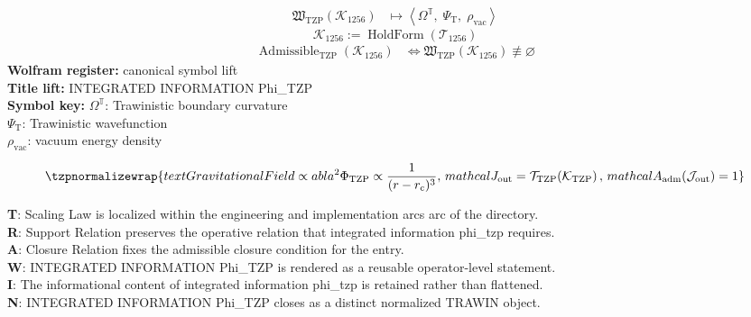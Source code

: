 \noindent
\begin{minipage}[t]{0.48\linewidth}
\begingroup
\small
\[
\begin{aligned}
\mathfrak{W}_{\mathrm{TZP}}\!\left(\mathcal{K}_{1256}\right)
&\longmapsto
\left\langle \Omega^{\mathbb{T}},\; \Psi_{\mathrm{T}},\; \rho_{\mathrm{vac}} \right\rangle
\end{aligned}
\]
\[
\mathcal{K}_{1256}
:=
\operatorname{HoldForm}\!\left(\mathcal{T}_{1256}\right)
\]
\[
\begin{aligned}
\operatorname{Admissible}_{\mathrm{TZP}}\!\left(\mathcal{K}_{1256}\right)
&\Longleftrightarrow
\mathfrak{W}_{\mathrm{TZP}}\!\left(\mathcal{K}_{1256}\right)\not\equiv\varnothing
\end{aligned}
\]
\textbf{Wolfram register:} canonical symbol lift\\
\textbf{Title lift:} INTEGRATED INFORMATION Phi\_TZP\\
\textbf{Symbol key:} \(\Omega^{\mathbb{T}}\): Trawinistic boundary curvature\\ \(\Psi_{\mathrm{T}}\): Trawinistic wavefunction\\ \(\rho_{\mathrm{vac}}\): vacuum energy density
\par
\endgroup
\end{minipage}\hfill
\begin{minipage}[t]{0.48\linewidth}
\[
\tzpnormalizewrap{text{Gravitational Field} \propto  abla^2 \Phi_{\text{TZP}} \propto \frac{1}{(r - r_{\mathrm{c}})^3},\,mathcal{J}_{\mathrm{out}} = \mathcal{T}_{\mathrm{TZP}}\!\left(\mathcal{K}_{\mathrm{TZP}}\right),\,mathcal{A}_{\mathrm{adm}}\!\left(\mathcal{J}_{\mathrm{out}}\right)=1}
\]

\small
\textbf{T}: Scaling Law is localized within the engineering and implementation arcs arc of the directory.\\
\textbf{R}: Support Relation preserves the operative relation that integrated information phi\_tzp requires.\\
\textbf{A}: Closure Relation fixes the admissible closure condition for the entry.\\
\textbf{W}: INTEGRATED INFORMATION Phi\_TZP is rendered as a reusable operator-level statement.\\
\textbf{I}: The informational content of integrated information phi\_tzp is retained rather than flattened.\\
\textbf{N}: INTEGRATED INFORMATION Phi\_TZP closes as a distinct normalized TRAWIN object.
\normalsize
\end{minipage}

